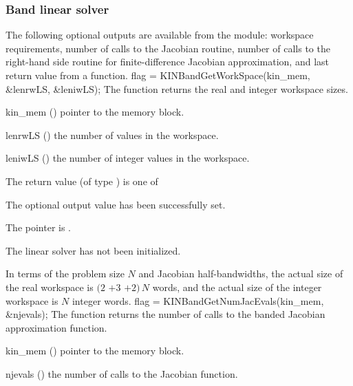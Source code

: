 \subsubsection{Band linear solver}\label{sss:optout_band}
The following optional outputs are available from the {\kinband} module:
workspace requirements, number of calls to the Jacobian routine, number of 
calls to the right-hand side routine for finite-difference Jacobian approximation,
and last return value from a {\kinband} function.
{
  flag = KINBandGetWorkSpace(kin\_mem, \&lenrwLS, \&leniwLS);
}
{
  The function  returns the
  {\kinband} real and integer workspace sizes.
}
{
  \begin{args}
  \item[kin\_mem] ()
    pointer to the {\cvode} memory block.
  \item[lenrwLS] ()
    the number of  values in the {\kinband} workspace.
  \item[leniwLS] ()
    the number of integer values in the {\kinband} workspace.
  \end{args}
}
{
  The return value  (of type ) is one of
  \begin{args}
  \item[\Id{KINBAND\_SUCCESS}] 
    The optional output value has been successfully set.
  \item[\Id{KINBAND\_MEM\_NULL}]
    The  pointer is .
  \item[\Id{KINBAND\_LMEM\_NULL}]
    The {\kinband} linear solver has not been initialized.
  \end{args}
}
{
  In terms of the problem size $N$ and Jacobian half-bandwidths, 
  the actual size of the real workspace is
  $(2$ $+ 3$  $+ 2)\, N$  words,
  and the actual size of the integer workspace is $N$ integer words.
}
{
  flag = KINBandGetNumJacEvals(kin\_mem, \&njevals);
}
{
  The function  returns the
  number of calls to the banded Jacobian approximation function.
}
{
  \begin{args}
  \item[kin\_mem] ()
    pointer to the {\cvode} memory block.
  \item[njevals] ()
    the number of calls to the Jacobian function.
  \end{args}
}
